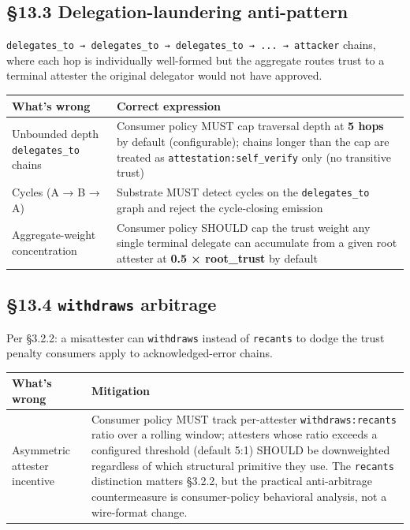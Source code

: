 \documentclass[11pt]{article}
\begin{document}
\subsection*{§13.3 Delegation-laundering anti-pattern}


\texttt{delegates\_to → delegates\_to → delegates\_to → ... → attacker} chains, where each hop is individually well-formed but the aggregate routes trust to a terminal attester the original delegator would not have approved.


{\footnotesize
\begin{longtable}{|p{8.0cm}|p{8.0cm}|}\hline
\textbf{What's wrong} & \textbf{Correct expression} \\ \hline\endhead
Unbounded depth \texttt{delegates\_to} chains & Consumer policy MUST cap traversal depth at \textbf{5 hops} by default (configurable); chains longer than the cap are treated as \texttt{attestation:self\_verify} only (no transitive trust) \\ \hline
Cycles (A → B → A) & Substrate MUST detect cycles on the \texttt{delegates\_to} graph and reject the cycle-closing emission \\ \hline
Aggregate-weight concentration & Consumer policy SHOULD cap the trust weight any single terminal delegate can accumulate from a given root attester at \textbf{0.5 × root\_trust} by default \\ \hline
\end{longtable}}


\subsection*{§13.4 \texttt{withdraws} arbitrage}


Per §3.2.2: a misattester can \texttt{withdraws} instead of \texttt{recants} to dodge the trust penalty consumers apply to acknowledged-error chains.


{\footnotesize
\begin{longtable}{|p{8.0cm}|p{8.0cm}|}\hline
\textbf{What's wrong} & \textbf{Mitigation} \\ \hline\endhead
Asymmetric attester incentive & Consumer policy MUST track per-attester \texttt{withdraws:recants} ratio over a rolling window; attesters whose ratio exceeds a configured threshold (default 5:1) SHOULD be downweighted regardless of which structural primitive they use. The \texttt{recants} distinction matters §3.2.2, but the practical anti-arbitrage countermeasure is consumer-policy behavioral analysis, not a wire-format change. \\ \hline
\end{longtable}}
\end{document}
